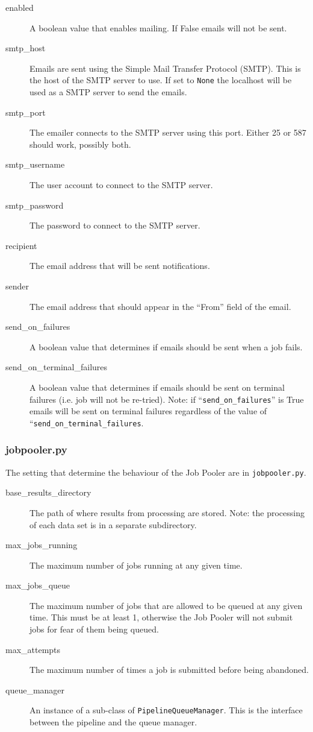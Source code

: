 \begin{description}
    \item[enabled] A boolean value that enables mailing. If False emails will not be sent.
    \item[smtp\_host] Emails are sent using the Simple Mail Transfer Protocol (SMTP). This is the host of the SMTP server to use. If set to \texttt{None} the localhost will be used as a SMTP server to send the emails.
    \item[smtp\_port] The emailer connects to the SMTP server using this port. Either 25 or 587 should work, possibly both.
    \item[smtp\_username] The user account to connect to the SMTP server.
    \item[smtp\_password] The password to connect to the SMTP server.
    \item[recipient] The email address that will be sent notifications.
    \item[sender] The email address that should appear in the ``From'' field of the email.
    \item[send\_on\_failures] A boolean value that determines if emails should be sent when a job fails.
    \item[send\_on\_terminal\_failures] A boolean value that determines if emails should be sent on terminal failures (i.e. job will not be re-tried). Note: if ``\texttt{send\_on\_failures}'' is True emails will be sent on terminal failures regardless of the value of ``\texttt{send\_on\_terminal\_failures}.
\end{description}


\subsubsection{jobpooler.py}
The setting that determine the behaviour of the Job Pooler are in \texttt{jobpooler.py}.

\begin{description}
    \item[base\_results\_directory] The path of where results from processing are stored. Note: the processing of each data set is in a separate subdirectory.
    \item[max\_jobs\_running] The maximum number of jobs running at any given time.
    \item[max\_jobs\_queue] The maximum number of jobs that are allowed to be queued at any given time. This must be at least 1, otherwise the Job Pooler will not submit jobs for fear of them being queued.
    \item[max\_attempts] The maximum number of times a job is submitted before being abandoned.
    \item[queue\_manager] An instance of a sub-class of \texttt{PipelineQueueManager}. This is the interface between the pipeline and the queue manager.
\end{description}

